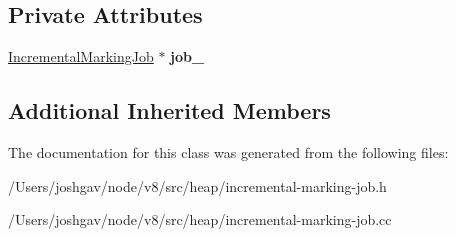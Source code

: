 \subsection*{Private Attributes}
\begin{DoxyCompactItemize}
\item 
\hyperlink{classv8_1_1internal_1_1_incremental_marking_job}{Incremental\+Marking\+Job} $\ast$ {\bfseries job\+\_\+}\hypertarget{classv8_1_1internal_1_1_incremental_marking_job_1_1_delayed_task_a771268b88d9a38258ed15dd64488669d}{}\label{classv8_1_1internal_1_1_incremental_marking_job_1_1_delayed_task_a771268b88d9a38258ed15dd64488669d}

\end{DoxyCompactItemize}
\subsection*{Additional Inherited Members}


The documentation for this class was generated from the following files\+:\begin{DoxyCompactItemize}
\item 
/\+Users/joshgav/node/v8/src/heap/incremental-\/marking-\/job.\+h\item 
/\+Users/joshgav/node/v8/src/heap/incremental-\/marking-\/job.\+cc\end{DoxyCompactItemize}
